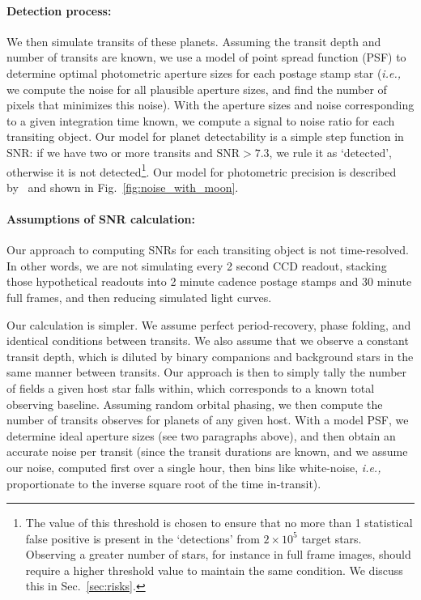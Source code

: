 \paragraph{Detection process:}
We then simulate transits of these planets.
Assuming the transit depth and number of transits are known, we
use a model of \tesss point spread function (PSF) to determine optimal photometric aperture sizes for each postage stamp star (\textit{i.e.,} we compute the noise for all plausible aperture sizes, and find the number of pixels that minimizes this noise).
With the aperture sizes and noise corresponding to a given integration time known, we compute a signal to noise ratio for each transiting object.
Our model for planet detectability is a simple step function in SNR: if we have two or more transits and $\text{SNR} > 7.3$, we rule it as `detected', otherwise it is not detected\footnote{The value of this threshold is chosen to ensure that no more than 1 statistical false positive is present in the `detections' from $2\times10^5$ target stars. Observing a greater number of stars, for instance in full frame images, should require a higher threshold value to maintain the same condition. We discuss this in Sec.~\protect\ref{sec:risks}.}. 
Our model for \tesss photometric precision is described by~ and shown in Fig.~\ref{fig:noise_with_moon}.

\paragraph{Assumptions of SNR calculation:}
Our approach to computing SNRs for each transiting object is not time-resolved. 
In other words, we are not simulating every 2 second CCD readout, stacking those hypothetical readouts into 2 minute cadence postage stamps and 30 minute full frames, and then reducing simulated light curves.

Our calculation is simpler. 
We assume perfect period-recovery, phase folding, and identical conditions between transits. %
We also assume that we observe a constant transit depth, which is diluted by binary companions and background stars in the same manner between transits.
Our approach is then to simply tally the number of \tess fields a given host star falls within, which corresponds to a known total observing baseline.
Assuming random orbital phasing, we then compute the number of transits \tess observes for planets of any given host.
With a model PSF, we determine ideal aperture sizes (see two paragraphs above), and then obtain an accurate noise per transit (since the transit durations are known, and we assume our noise, computed first over a single hour, then bins like white-noise, \textit{i.e.,} proportionate to the inverse square root of the time in-transit).

